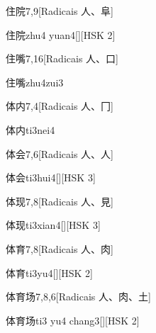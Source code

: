 \begin{entry}{住院}{7,9}[Radicais ⼈、⾩]
  \begin{phonetics}{住院}{zhu4 yuan4}[][HSK 2]
  \end{phonetics}
\end{entry}

\begin{entry}{住嘴}{7,16}[Radicais ⼈、⼝]
  \begin{phonetics}{住嘴}{zhu4zui3}
  \end{phonetics}
\end{entry}

\begin{entry}{体内}{7,4}[Radicais ⼈、⼌]
  \begin{phonetics}{体内}{ti3nei4}
  \end{phonetics}
\end{entry}

\begin{entry}{体会}{7,6}[Radicais ⼈、⼈]
  \begin{phonetics}{体会}{ti3hui4}[][HSK 3]
  \end{phonetics}
\end{entry}

\begin{entry}{体现}{7,8}[Radicais ⼈、⾒]
  \begin{phonetics}{体现}{ti3xian4}[][HSK 3]
  \end{phonetics}
\end{entry}

\begin{entry}{体育}{7,8}[Radicais ⼈、⾁]
  \begin{phonetics}{体育}{ti3yu4}[][HSK 2]
  \end{phonetics}
\end{entry}

\begin{entry}{体育场}{7,8,6}[Radicais ⼈、⾁、⼟]
  \begin{phonetics}{体育场}{ti3 yu4 chang3}[][HSK 2]
  \end{phonetics}
\end{entry}

